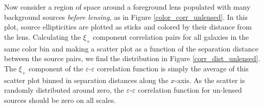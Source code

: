 \documentclass[%
 reprint,
 amsmath,amssymb,
 aps,nofootinbib
]{revtex4-1}
\begin{document}
Now consider a region of space around a foreground lens populated with many background sources \textit{before lensing}, as in Figure \ref{color_corr_unlensed}. In this plot, source ellipticities are plotted as sticks and colored by their distance from the lens. Calculating the $\xi_+$ component correlation pairs for all galaxies in the same color bin and making a scatter plot as a function of the separation distance between the source pairs, we find the distribution in Figure \ref{corr_dist_unlensed}. The $\xi_+$ component of the $\varepsilon$-$\varepsilon$ correlation function is simply the average of this scatter plot binned in separation distances along the $x$-axis. As the scatter is randomly distributed around zero, the $\varepsilon$-$\varepsilon$ correlation function for un-lensed sources should be zero on all scales.
\end{document}
